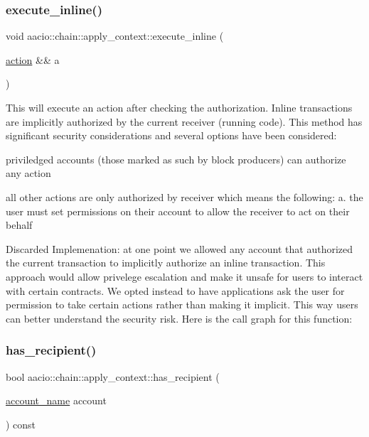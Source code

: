 \subsubsection{\texorpdfstring{execute\+\_\+inline()}{execute\_inline()}}
{\footnotesize\ttfamily void aacio\+::chain\+::apply\+\_\+context\+::execute\+\_\+inline (\begin{DoxyParamCaption}\item[{\mbox{\hyperlink{structaacio_1_1chain_1_1action}{action}} \&\&}]{a }\end{DoxyParamCaption})}

This will execute an action after checking the authorization. Inline transactions are implicitly authorized by the current receiver (running code). This method has significant security considerations and several options have been considered\+:


\begin{DoxyEnumerate}
\item priviledged accounts (those marked as such by block producers) can authorize any action
\item all other actions are only authorized by \textquotesingle{}receiver\textquotesingle{} which means the following\+: a. the user must set permissions on their account to allow the \textquotesingle{}receiver\textquotesingle{} to act on their behalf
\end{DoxyEnumerate}

Discarded Implemenation\+: at one point we allowed any account that authorized the current transaction to implicitly authorize an inline transaction. This approach would allow privelege escalation and make it unsafe for users to interact with certain contracts. We opted instead to have applications ask the user for permission to take certain actions rather than making it implicit. This way users can better understand the security risk. Here is the call graph for this function\+:
\mbox{\label{classaacio_1_1chain_1_1apply__context_ac787146418685b7dda0b701e6cb7515b}} 
\subsubsection{\texorpdfstring{has\+\_\+recipient()}{has\_recipient()}}
{\footnotesize\ttfamily bool aacio\+::chain\+::apply\+\_\+context\+::has\+\_\+recipient (\begin{DoxyParamCaption}\item[{\mbox{\hyperlink{structaacio_1_1chain_1_1name}{account\+\_\+name}}}]{account }\end{DoxyParamCaption}) const}

